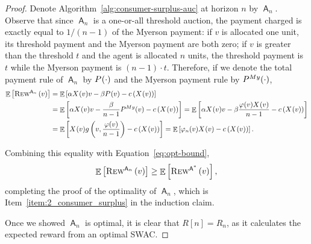 \documentclass[11pt,letterpaper]{article}
\newcommand{\sqbr}[1]{\left[ #1 \right]}
\newcommand{\brackets}[1]{\left( #1 \right)}
\newcommand{\swac}{SWAC\xspace}
\DeclareMathOperator*{\E}{\bb{E}}
\newcommand{\bb}[1]{\mathbb{#1}}
\DeclareMathOperator{\A}{\auc{A}}
\newcommand{\g}{g}
\theoremstyle{plain}
\newcommand{\auc}[1]{\mathsf{#1}}
\begin{document}
\begin{proof}
 Denote Algorithm~\ref{alg:consumer-surplus-auc} at horizon $n$ by $\A_n$.
Observe that since $\A_n$ is a one-or-all threshold auction, the payment charged is exactly equal to ${1}/{(n-1)}$ of the Myerson payment: if $v$ is allocated one unit, its threshold payment and the Myerson payment are both zero; if $v$ is greater than the threshold $t$ and the agent is allocated $n$ units, the threshold payment is $t$ while the Myerson payment is $(n-1)\cdot t$.
Therefore, if we denote the total payment rule of $\A_n$ by $\p{\cdot}$ and the Myerson payment rule by $\p[My]{\cdot}$,
\begin{align*}
    \E\sqbr{\trew[\A_n]{v}}&=\E\sqbr{\alpha\x{v} v -\beta\p{v}-c\brackets{\x{v}} }
    \\
                        &=\E\sqbr{\alpha\x{v} v -\frac{\beta}{n-1}\p[My]{v}-c\brackets{\x{v}} }
                        =\E\sqbr{\alpha\x{v} v -\beta\frac{\varphi(v)\x{v}}{n-1}-c\brackets{\x{v}}}
                        \\
                        &
                        =\E\sqbr{\x{v}\g\brackets{v,\frac{\varphi(v)}{n-1}}-c\brackets{\x{v}}}
                        =\E\sqbr{\varphi_{n}(v)\x{v}-c\brackets{\x{v}}}.
\end{align*}

Combining this equality with Equation~\ref{eq:opt-bound},
\begin{align}
    \E\sqbr{\trew[\A_n]{v}}\geq\E\sqbr{\trew[\A^\ast]{v}},
\end{align}
completing the proof of the optimality of $\A_n$, which is Item~\ref{item:2_consumer_surplus} in the induction claim.

Once we showed $\A_n$ is optimal, it is clear that $R[n]=R_n$, as it calculates the expected reward from an optimal \swac.
    
\end{proof}
\end{document}
